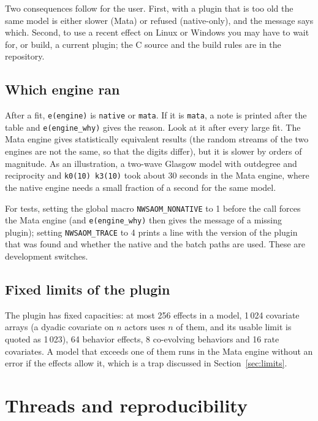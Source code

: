 Two consequences follow for the user. First, with a plugin that is too old the same model is either slower (Mata) or refused (native-only), and the message says which. Second, to use a recent effect on Linux or Windows you may have to wait for, or build, a current plugin; the C source and the build rules are in the repository.

\subsection{Which engine ran}

After a fit, \texttt{e(engine)} is \texttt{native} or \texttt{mata}. If it is \texttt{mata}, a note is printed after the table and \texttt{e(engine\_why)} gives the reason. Look at it after every large fit. The Mata engine gives statistically equivalent results (the random streams of the two engines are not the same, so that the digits differ), but it is slower by orders of magnitude. As an illustration, a two-wave Glasgow model with outdegree and reciprocity and \texttt{k0(10) k3(10)} took about 30 seconds in the Mata engine, where the native engine needs a small fraction of a second for the same model.

For tests, setting the global macro \texttt{NWSAOM\_NONATIVE} to 1 before the call forces the Mata engine (and \texttt{e(engine\_why)} then gives the message of a missing plugin); setting \texttt{NWSAOM\_TRACE} to 4 prints a line with the version of the plugin that was found and whether the native and the batch paths are used. These are development switches.

\subsection{Fixed limits of the plugin}

The plugin has fixed capacities: at most 256 effects in a model, 1\,024 covariate arrays (a dyadic covariate on $n$ actors uses $n$ of them, and its usable limit is quoted as 1\,023), 64 behavior effects, 8 co-evolving behaviors and 16 rate covariates. A model that exceeds one of them runs in the Mata engine without an error if the effects allow it, which is a trap discussed in Section~\ref{sec:limits}.

\section{Threads and reproducibility}\label{sec:threads}


